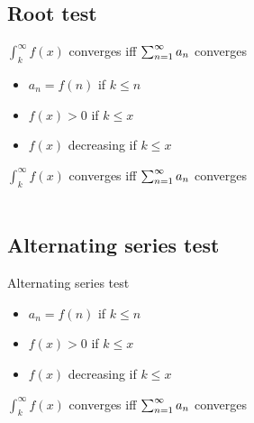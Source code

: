 \subsection{Root test}

\begin{property}{ $\int_{k}^{\infty} f(x)$ converges iff  $\sum_{n=1}^{\infty} a_n$ converges }
    \begin{precondition}
        \begin{itemize}
            \item $a_n=f(n)$ if $k \leq n$
            \item $f(x)>0$ if $k \leq x$
            \item $f(x)$ decreasing if $k \leq x$
        \end{itemize}
    \end{precondition}
    \begin{claim}
        $\int_{k}^{\infty} f(x)$ converges iff  $\sum_{n=1}^{\infty} a_n$ converges
    \end{claim}
    \begin{Proof}
        \begin{align*}
        \end{align*}
    \end{Proof}
\end{property}


\subsection{Alternating series test}

\begin{property}{ Alternating series test }
    \begin{precondition}
        \begin{itemize}
            \item $a_n=f(n)$ if $k \leq n$
            \item $f(x)>0$ if $k \leq x$
            \item $f(x)$ decreasing if $k \leq x$
        \end{itemize}
    \end{precondition}
    \begin{claim}
        $\int_{k}^{\infty} f(x)$ converges iff  $\sum_{n=1}^{\infty} a_n$ converges
    \end{claim}
    \begin{Proof}
        \begin{align*}
        \end{align*}
    \end{Proof}
\end{property}
